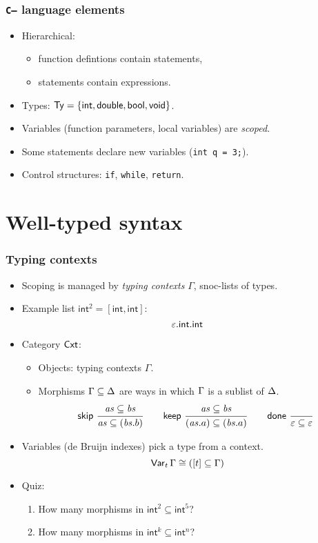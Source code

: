 \documentclass[t,fleqn,usenames,dvipsnames]{beamer}
\newcommand{\cAnn}{\color{red!80!black}}%
\renewcommand{\emph}[1]{{\cAnn#1}}
\newcommand{\cType}{\color{orange!60!black}}
\renewcommand{\emph}[1]{\textit{\cType#1}}
\newcommand{\Var}[2][]{\mathsf{Var}_{#1}\,#2}
\newcommand{\tskip}{\mathsf{skip}}
\newcommand{\tkeep}{\mathsf{keep}}
\newcommand{\tdone}{\mathsf{done}}
\newcommand{\sublist}{\subseteq}
\newcommand{\tint}{\mathsf{int}}
\newcommand{\tbool}{\mathsf{bool}}
\newcommand{\tvoid}{\mathsf{void}}
\newcommand{\tdouble}{\mathsf{double}}
\newcommand{\Cmm}{\texttt{C--}\xspace}
\begin{document}
\begin{frame}[fragile=singleslide]
  \frametitle{\Cmm language elements}
  \vspace{-3ex}
  \begin{itemize}
  \item Hierarchical:
    \begin{itemize}
    \item function defintions contain statements,
    \item statements contain expressions.
    \end{itemize}
  \item Types: $\Ty = \{ \tint, \tdouble,  \tbool, \tvoid \}$.
  \item Variables (function parameters, local variables) are \emph{scoped}.
  \item Some statements declare new variables (\verb|int q = 3;|).
  \item Control structures: \verb|if|, \verb|while|, \verb|return|.
  \end{itemize}
\end{frame}


\section{Well-typed syntax}

\begin{frame}%
  \frametitle{Typing contexts}
  \vspace{-3ex}
  \begin{itemize}
  \item Scoping is managed by \emph{typing contexts} $\Gamma$,
    snoc-lists of types.
  \item Example list $\tint^2 = [\tint,\tint]$:
$$
  \Ge.\tint.\tint
$$
\vspace{-2ex}
  \item Category $\mathsf{Cxt}$:
    \begin{itemize}
    \item Objects: typing contexts $\Gamma$.
    \item Morphisms $\GG \sublist \GD$ are ways in which $\Gamma$ is a
      sublist of $\Delta$.
\[
  \nru{\tskip}{\vas \sublist \vbs}{\vas \sublist (\vbs.b)}
\qquad
  \nru{\tkeep}{\vas \sublist \vbs}{(\vas.a) \sublist (\vbs.a)}
\qquad
  \nru{\tdone}{}{\Ge \sublist \Ge}
\]
    \end{itemize}
  \item Variables (de Bruijn indexes) pick a type from a context.
\[
  \Var[t] \GG \cong ([t] \sublist \GG)
\]
\vspace{-2ex}
  \item Quiz:
    \begin{enumerate}
    \item How many morphisms in $\tint^2 \sublist \tint^5$?
    \item How many morphisms in $\tint^k \sublist \tint^n$?
    \end{enumerate}
  \end{itemize}
\end{frame}
\end{document}
